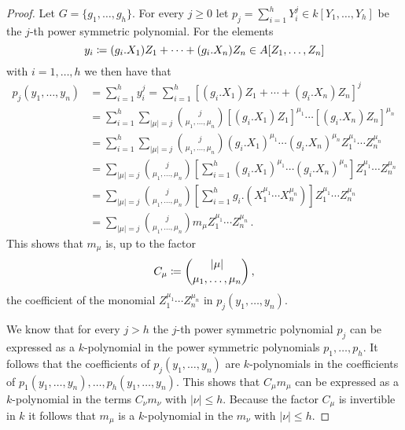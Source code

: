 \begin{proof}
  Let $G = \{g_1, \dotsc, g_h\}$.
  For every $j \geq 0$ let $p_j = \sum_{i=1}^h Y_i^j \in k[Y_1, \dotsc, Y_h]$ be the $j$-th power symmetric polynomial.
  For the elements
  \[
              y_i
    \coloneqq  (g_i.X_1) Z_1 + \dotsb + (g_i.X_n) Z_n
    \in       A[Z_1, \dotsc, Z_n]
  \]
  with $i = 1, \dotsc, h$ we then have that
  \begin{align*}
        p_j(y_1, \dotsc, y_n)
    &=  \sum_{i=1}^h y_i^j
     =  \sum_{i=1}^h \left[ (g_i.X_1) Z_1 + \dotsb + (g_i.X_n) Z_n \right]^j  \\
    &=  \sum_{i=1}^h \sum_{|\mu| = j}
        \binom{j}{\mu_1, \dotsc, \mu_n} [(g_i.X_1) Z_1]^{\mu_1} \dotsm [(g_i.X_n) Z_n]^{\mu_n}  \\
    &=  \sum_{i=1}^h \sum_{|\mu| = j}
        \binom{j}{\mu_1, \dotsc, \mu_n} (g_i.X_1)^{\mu_1} \dotsm (g_i.X_n)^{\mu_n} Z_1^{\mu_1} \dotsm Z_n^{\mu_n} \\
    &=  \sum_{|\mu| = j} \binom{j}{\mu_1, \dotsc, \mu_n}
        \left[
          \sum_{i=1}^h (g_i.X_1)^{\mu_1} \dotsm (g_i.X_n)^{\mu_n}
        \right]
        Z_1^{\mu_1} \dotsm Z_n^{\mu_n}  \\
    &=  \sum_{|\mu| = j} \binom{j}{\mu_1, \dotsc, \mu_n}
        \left[
          \sum_{i=1}^h g_i.(X_1^{\mu_1} \dotsm X_n^{\mu_n})
        \right]
        Z_1^{\mu_1} \dotsm Z_n^{\mu_n}  \\
    &=  \sum_{|\mu| = j} \binom{j}{\mu_1, \dotsc, \mu_n} m_\mu Z_1^{\mu_1} \dotsm Z_n^{\mu_n} \,.
  \end{align*}
  This shows that $m_\mu$ is, up to the factor
  \[
              C_\mu
    \coloneqq  \binom{|\mu|}{\mu_1, \dotsc, \mu_n} \,,
  \]
  the coefficient of the monomial $Z_1^{\mu_1} \dotsm Z_n^{\mu_n}$ in $p_j(y_1, \dotsc, y_n)$.
  
  We know that for every $j > h$ the $j$-th power symmetric polynomial $p_j$ can be expressed as a $k$-polynomial in the power symmetric polynomials $p_1, \dotsc, p_h$.
  It follows that the coefficients of $p_j(y_1, \dotsc, y_n)$ are $k$-polynomials in the coefficients of $p_1(y_1, \dotsc, y_n), \dotsc, p_h(y_1, \dotsc, y_n)$.
  This shows that $C_\mu m_\mu$ can be expressed as a $k$-polynomial in the terms $C_\nu m_\nu$ with $|\nu| \leq h$.
  Because the factor $C_\mu$ is invertible in $k$ it follows that $m_\mu$ is a $k$-polynomial in the $m_\nu$ with $|\nu| \leq h$.
\end{proof}


